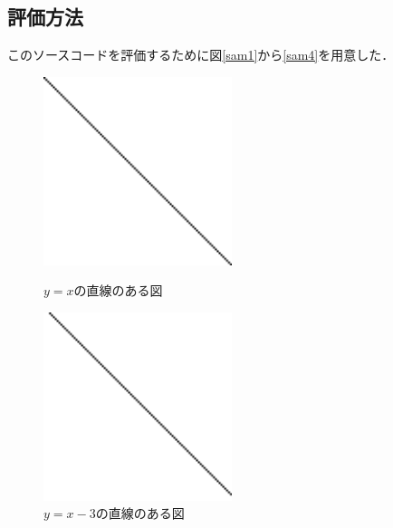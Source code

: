 \documentclass[titlepage]{jarticle}
\begin{document}
\subsection{評価方法}
このソースコードを評価するために図\ref{sam1}から\ref{sam4}を用意した．
\begin{figure}[H]
  \begin{minipage}{0.495\hsize}
    \centering
    \includegraphics[width=5.5cm]{img/sam1.png}
    \caption{$y = x$の直線のある図}
    \label{sam1}
  \end{minipage}
  \begin{minipage}{0.495\hsize}
    \centering
    \includegraphics[width=5.5cm]{img/sam2.png}
    \caption{$y = x - 3$の直線のある図}
    \label{sam2}
  \end{minipage}


\end{figure}
\end{document}
